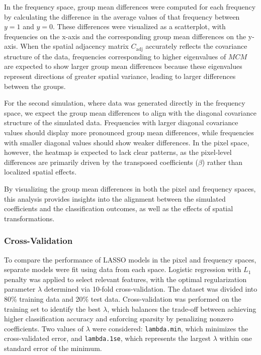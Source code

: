 \documentclass[12pt]{article}
\begin{document}
In the frequency space, group mean differences were computed for each frequency by calculating the difference in the average values of that frequency between \( y = 1 \) and \( y = 0 \). These differences were visualized as a scatterplot, with frequencies on the x-axis and the corresponding group mean differences on the y-axis. When the spatial adjacency matrix \( C_{\text{adj}} \) accurately reflects the covariance structure of the data, frequencies corresponding to higher eigenvalues of \( MCM \) are expected to show larger group mean differences because these eigenvalues represent directions of greater spatial variance, leading to larger differences between the groups.

For the second simulation, where data was generated directly in the frequency space, we expect the group mean differences to align with the diagonal covariance structure of the simulated data. Frequencies with larger diagonal covariance values should display more pronounced group mean differences, while frequencies with smaller diagonal values should show weaker differences. In the pixel space, however, the heatmap is expected to lack clear patterns, as the pixel-level differences are primarily driven by the transposed coefficients (\( \beta \)) rather than localized spatial effects.

By visualizing the group mean differences in both the pixel and frequency spaces, this analysis provides insights into the alignment between the simulated coefficients and the classification outcomes, as well as the effects of spatial transformations.


\subsubsection{Cross-Validation}

To compare the performance of LASSO models in the pixel and frequency spaces, separate models were fit using data from each space. Logistic regression with \( L_1 \) penalty was applied to select relevant features, with the optimal regularization parameter \( \lambda \) determined via 10-fold cross-validation. The dataset was divided into 80\% training data and 20\% test data. Cross-validation was performed on the training set to identify the best \( \lambda \), which balances the trade-off between achieving higher classification accuracy and enforcing sparsity by penalizing nonzero coefficients. Two values of \( \lambda \) were considered: \texttt{lambda.min}, which minimizes the cross-validated error, and \texttt{lambda.1se}, which represents the largest \( \lambda \) within one standard error of the minimum.
\end{document}
